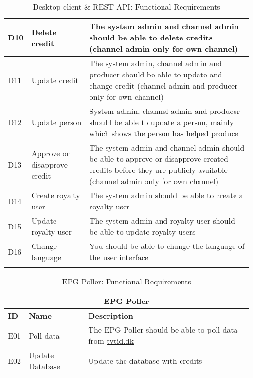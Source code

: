 \documentclass[a4paper,12pt]{article}
\begin{document}
\begin{longtable}{|p{1cm}|p{3.5cm}|p{11cm}|}
    \hline
    D10 & Delete credit & The system admin and channel admin should be able to delete credits (channel admin only for own channel) \\
    \hline
    D11 & Update credit & The system admin, channel admin and producer should be able to update and change credit (channel admin and producer only for own channel) \\
    \hline
    D12 & Update person & System admin, channel admin and producer should be able to update a person, mainly which shows the person has helped produce \\
    \hline
    D13 & Approve or disapprove credit & The system admin and channel admin should be able to approve or disapprove created credits before they are publicly available (channel admin only for own channel) \\
    \hline
    D14 & Create royalty user & The system admin should be able to create a royalty user \\
    \hline
    D15 & Update royalty user & The system admin and royalty user should be able to update royalty users \\%
    \hline
    D16 & Change language & You should be able to change the language of the user interface \\
    \hline
    
    \caption{Desktop-client \& REST API: Functional Requirements}
    \label{tab:desktop_client_rest_api_funreq}
\end{longtable}

\newpage
\begin{table}[h]
    \begin{tabular}{|p{1cm}|p{3.5cm}|p{11cm}|}
        \hline
        \multicolumn{3}{|c|}{\textbf{EPG Poller}} \\
        \hline
        \textbf{ID} & \textbf{Name} & \textbf{Description} \\
        \hline
        E01 & Poll-data
        &  The EPG Poller should be able to poll data from \href{www.tvtid.tv2.dk}{tvtid.dk} \\
        \hline
        E02 & Update Database & Update the database with credits \\
        \hline
    \end{tabular}
    \caption{EPG Poller: Functional Requirements}
    \label{tab:epg_poller_funreq}
\end{table}
\end{document}
